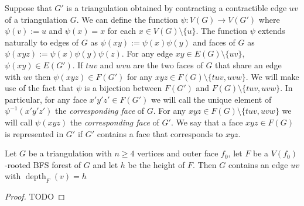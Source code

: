 \documentclass{patmorin}
\DeclareMathOperator{\depth}{depth}
\begin{document}
Suppose that $G'$ is a triangulation obtained by contracting a contractible edge $uv$ of a triangulation $G$.  We can define the function $\psi:V(G)\to V(G')$ where $\psi(v):=u$ and $\psi(x)=x$ for each $x\in V(G)\setminus\{u\}$. The function $\psi$ extends naturally to edges of $G$ as $\psi(xy):=\psi(x)\psi(y)$ and faces of $G$ as $\psi(xyz):=\psi(x)\psi(y)\psi(z)$.  For any edge $xy\in E(G)\setminus\{uv\}$,  $\psi(xy)\in E(G')$.  If $tuv$ and $wvu$ are the two faces of $G$ that share an edge with $uv$ then $\psi(xyz)\in F(G')$ for any $xyz\in F(G)\setminus\{tuv,uvw\}$.  We will make use of the fact that $\psi$ is a bijection between $F(G')$ and $F(G)\setminus\{tuv,uvw\}$.  In particular, for any face $x'y'z'\in F(G')$ we will call the unique element of $\psi^{-1}(x'y'z')$ the \emph{corresponding face} of $G$.  For any $xyz\in F(G)\setminus\{tuv,uvw\}$ we will call $\psi(xyz)$ the \emph{corresponding face} of $G'$.  We say that a face $xyz\in F(G)$ is represented in $G'$ if $G'$ contains a face that corresponds to $xyz$.

\begin{lem}\label{good_edge}
  Let $G$ be a triangulation with $n\ge 4$ vertices and outer face $f_0$, let $F$ be a $V(f_0)$-rooted BFS forest of $G$ and let $h$ be the height of $F$.
  Then $G$ contains an edge $uv$ with $\depth_F(v)=h$
\end{lem}

\begin{proof}
  TODO
\end{proof}
\end{document}
